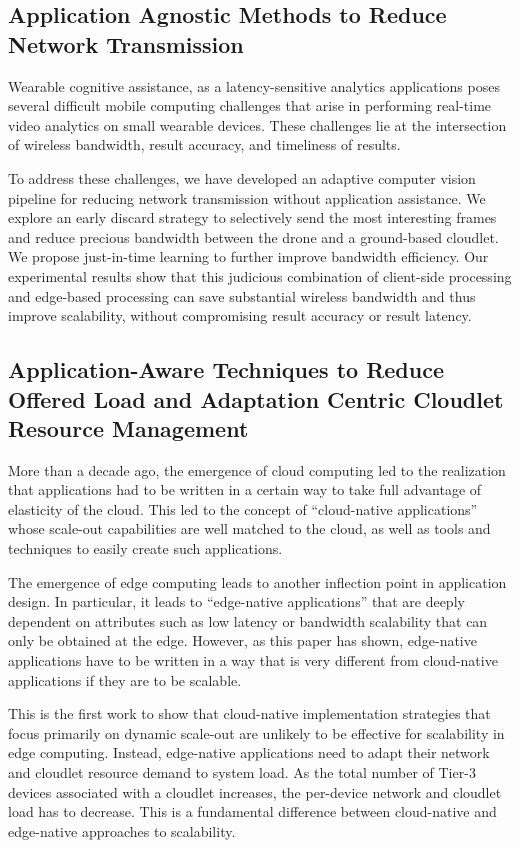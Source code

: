 \subsection{Application Agnostic Methods to Reduce Network Transmission}

Wearable cognitive assistance, as a latency-sensitive analytics applications
poses several difficult mobile computing challenges that arise in performing
real-time video analytics on small wearable devices. These challenges lie at the
intersection of wireless bandwidth, result accuracy, and timeliness of results.

To address these challenges, we have developed an adaptive computer vision
pipeline for reducing network transmission without application assistance.  We
explore an early discard strategy to selectively send the most interesting
frames and reduce precious bandwidth between the drone and a ground-based
cloudlet. We propose just-in-time learning to further improve bandwidth
efficiency. Our experimental results show that this judicious combination of
client-side processing and edge-based processing can save substantial wireless
bandwidth and thus improve scalability, without compromising result accuracy or
result latency. 

\subsection{Application-Aware Techniques to Reduce Offered 
Load and Adaptation Centric Cloudlet Resource Management}

More than a decade ago, the emergence of cloud computing led to the
realization that applications had to be written in a certain way to
take full advantage of elasticity of the cloud.  This led to the
concept of ``cloud-native applications'' whose scale-out capabilities
are well matched to the cloud, as well as tools and techniques to
easily create such applications.

The emergence of edge computing leads to another inflection point in
application design.  In particular, it leads to ``edge-native
applications'' that are deeply dependent on attributes such as low
latency or bandwidth scalability that can only be obtained at the edge.
However, as this paper has shown, edge-native applications have to be 
written in a way that is very different from cloud-native applications
if they are to be scalable.

This is the first work to show that cloud-native implementation
strategies that focus primarily on dynamic scale-out are unlikely to
be effective for scalability in edge computing.  Instead, edge-native
applications need to adapt their network and cloudlet resource demand
to system load.  As the total number of Tier-3 devices associated with
a cloudlet increases, the per-device network and cloudlet load has to
decrease.  This is a fundamental difference between cloud-native and
edge-native approaches to scalability. 

